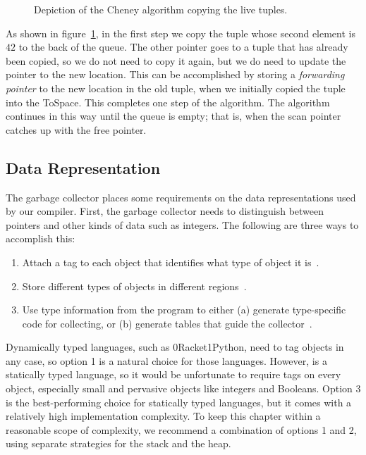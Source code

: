 \documentclass[7x10]{TimesAPriori_MIT}%
\def\racketEd{0}
\def\pythonEd{1}
\def\edition{1}
\newcommand{\racket}[1]{{\if\edition\racketEd{#1}\fi}}
\newcommand{\pythonColor}[0]{}
\newcommand{\python}[1]{{\if\edition\pythonEd\pythonColor #1\fi}}
\numberwithin{theorem}{chapter}
\numberwithin{definition}{chapter}
\numberwithin{equation}{chapter}
\begin{document}
\begin{figure}[tbp]
\caption{Depiction of the Cheney algorithm copying the live tuples.}
\label{fig:cheney}
\end{figure}

As shown in figure~\ref{fig:cheney}, in the first step we copy the
tuple whose second element is $42$ to the back of the queue. The other
pointer goes to a tuple that has already been copied, so we do not
need to copy it again, but we do need to update the pointer to the new
location. This can be accomplished by storing a \emph{forwarding
pointer} to the new location in the
old tuple, when we initially copied the tuple into the
ToSpace. This completes one step of the algorithm. The algorithm
continues in this way until the queue is empty; that is, when the scan
pointer catches up with the free pointer.


\subsection{Data Representation}
\label{sec:data-rep-gc}

The garbage collector places some requirements on the data
representations used by our compiler. First, the garbage collector
needs to distinguish between pointers and other kinds of data such as
integers. The following are three ways to accomplish this:
\begin{enumerate}
\item Attach a tag to each object that identifies what type of
  object it is~\citep{McCarthy:1960dz}.
\item Store different types of objects in different
  regions~\citep{Steele:1977ab}.
\item Use type information from the program to either (a) generate
  type-specific code for collecting, or (b) generate tables that 
  guide the collector~\citep{Appel:1989aa,Goldberg:1991aa,Diwan:1992aa}.
\end{enumerate}
Dynamically typed languages, such as \racket{Racket}\python{Python},
need to tag objects in any case, so option 1 is a natural choice for those
languages.  However, \LangVec{} is a statically typed language, so it
would be unfortunate to require tags on every object, especially small
and pervasive objects like integers and Booleans.  Option 3 is the
best-performing choice for statically typed languages, but it comes with
a relatively high implementation complexity. To keep this chapter
within a reasonable scope of complexity, we recommend a combination of options
1 and 2, using separate strategies for the stack and the heap.
\end{document}

